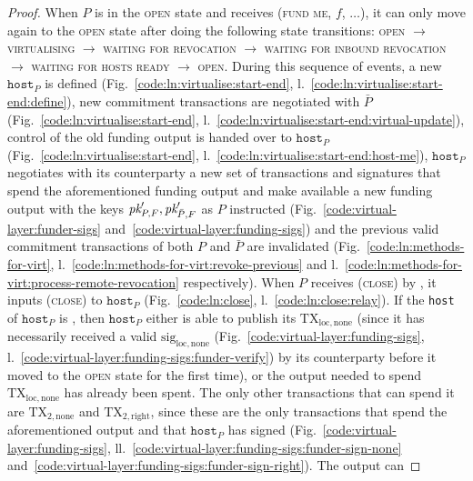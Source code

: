 \begin{proof}
  When $P$ is in the \textsc{open} state and receives (\textsc{fund me}, $f$,
  $\dots$), it can only move again to the \textsc{open} state after doing the
  following state transitions: \textsc{open} $\rightarrow$ \textsc{virtualising}
  $\rightarrow$ \textsc{waiting for revocation} $\rightarrow$ \textsc{waiting
  for inbound revocation} $\rightarrow$ \textsc{waiting for hosts ready}
  $\rightarrow$ \textsc{open}. During this sequence of events, a new
  $\texttt{host}_P$ is defined (Fig.~\ref{code:ln:virtualise:start-end},
  l.~\ref{code:ln:virtualise:start-end:define}), new commitment transactions are
  negotiated with $\bar{P}$ (Fig.~\ref{code:ln:virtualise:start-end},
  l.~\ref{code:ln:virtualise:start-end:virtual-update}), control of the old
  funding output is handed over to $\texttt{host}_P$
  (Fig.~\ref{code:ln:virtualise:start-end},
  l.~\ref{code:ln:virtualise:start-end:host-me}), $\texttt{host}_P$ negotiates
  with its counterparty a new set of transactions and signatures that spend the
  aforementioned funding output and make available a new funding output with the
  keys $\textit{pk}_{P, F}', \textit{pk}_{\bar{P}, F}'$ as $P$ instructed
  (Fig.~\ref{code:virtual-layer:funder-sigs}
  and~\ref{code:virtual-layer:funding-sigs}) and the previous valid commitment
  transactions of both $P$ and $\bar{P}$ are invalidated
  (Fig.~\ref{code:ln:methods-for-virt},
  l.~\ref{code:ln:methods-for-virt:revoke-previous} and
  l.~\ref{code:ln:methods-for-virt:process-remote-revocation} respectively).
  When $P$ receives (\textsc{close}) by \environment, it inputs (\textsc{close})
  to $\texttt{host}_P$ (Fig.~\ref{code:ln:close}, l.~\ref{code:ln:close:relay}).
  If the \texttt{host} of $\texttt{host}_P$ is \ledger, then $\texttt{host}_P$
  either is able to publish its $\mathrm{TX}_{\mathrm{loc}, \mathrm{none}}$
  (since it has necessarily received a valid $\mathrm{sig}_{\mathrm{loc},
  \mathrm{none}}$ (Fig.~\ref{code:virtual-layer:funding-sigs},
  l.~\ref{code:virtual-layer:funding-sigs:funder-verify}) by its counterparty
  before it moved to the \textsc{open} state for the first time), or the output
  needed to spend $\mathrm{TX}_{\mathrm{loc}, \mathrm{none}}$ has already been
  spent. The only other transactions that can spend it are $\mathrm{TX}_{2,
  \mathrm{none}}$ and $\mathrm{TX}_{2, \mathrm{right}}$, since these are the
  only transactions that spend the aforementioned output and that
  $\texttt{host}_P$ has signed (Fig.~\ref{code:virtual-layer:funding-sigs},
  ll.~\ref{code:virtual-layer:funding-sigs:funder-sign-none}
  and~\ref{code:virtual-layer:funding-sigs:funder-sign-right}). The output can

\end{proof}
